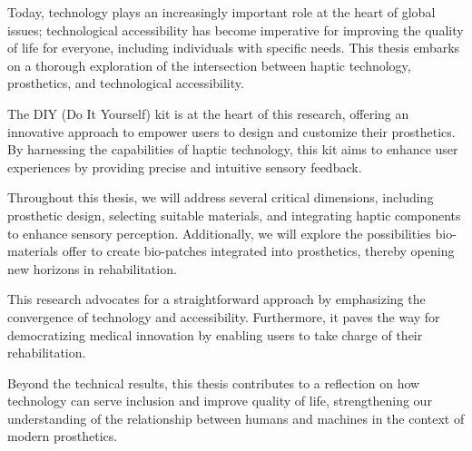 Today, technology plays an increasingly important role at the heart of global issues; technological accessibility has become imperative for improving the quality of life for everyone, including individuals with specific needs. This thesis embarks on a thorough exploration of the intersection between haptic technology, prosthetics, and technological accessibility.

The DIY (Do It Yourself) kit is at the heart of this research, offering an innovative approach to empower users to design and customize their prosthetics. By harnessing the capabilities of haptic technology, this kit aims to enhance user experiences by providing precise and intuitive sensory feedback.

Throughout this thesis, we will address several critical dimensions, including prosthetic design, selecting suitable materials, and integrating haptic components to enhance sensory perception. Additionally, we will explore the possibilities bio-materials offer to create bio-patches integrated into prosthetics, thereby opening new horizons in rehabilitation.

This research advocates for a straightforward approach by emphasizing the convergence of technology and accessibility. Furthermore, it paves the way for democratizing medical innovation by enabling users to take charge of their rehabilitation.

Beyond the technical results, this thesis contributes to a reflection on how technology can serve inclusion and improve quality of life, strengthening our understanding of the relationship between humans and machines in the context of modern prosthetics.
